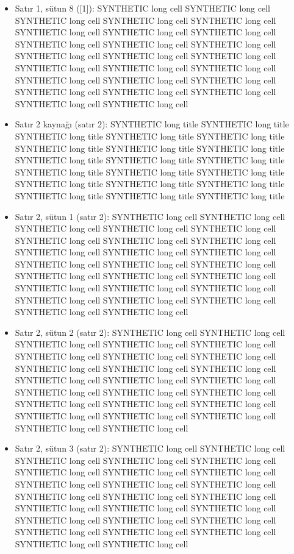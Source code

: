 \documentclass[journal]{IEEEtran}
\begin{document}
\begin{itemize}
\item[10.] Satır 1, sütun 8 ([1]): SYNTHETIC long cell SYNTHETIC long cell SYNTHETIC long cell SYNTHETIC long cell SYNTHETIC long cell SYNTHETIC long cell SYNTHETIC long cell SYNTHETIC long cell SYNTHETIC long cell SYNTHETIC long cell SYNTHETIC long cell SYNTHETIC long cell SYNTHETIC long cell SYNTHETIC long cell SYNTHETIC long cell SYNTHETIC long cell SYNTHETIC long cell SYNTHETIC long cell SYNTHETIC long cell SYNTHETIC long cell SYNTHETIC long cell SYNTHETIC long cell SYNTHETIC long cell SYNTHETIC long cell SYNTHETIC long cell
\item[11.] Satır 2 kaynağı (satır 2): SYNTHETIC long title SYNTHETIC long title SYNTHETIC long title SYNTHETIC long title SYNTHETIC long title SYNTHETIC long title SYNTHETIC long title SYNTHETIC long title SYNTHETIC long title SYNTHETIC long title SYNTHETIC long title SYNTHETIC long title SYNTHETIC long title SYNTHETIC long title SYNTHETIC long title SYNTHETIC long title SYNTHETIC long title SYNTHETIC long title SYNTHETIC long title SYNTHETIC long title
\item[12.] Satır 2, sütun 1 (satır 2): SYNTHETIC long cell SYNTHETIC long cell SYNTHETIC long cell SYNTHETIC long cell SYNTHETIC long cell SYNTHETIC long cell SYNTHETIC long cell SYNTHETIC long cell SYNTHETIC long cell SYNTHETIC long cell SYNTHETIC long cell SYNTHETIC long cell SYNTHETIC long cell SYNTHETIC long cell SYNTHETIC long cell SYNTHETIC long cell SYNTHETIC long cell SYNTHETIC long cell SYNTHETIC long cell SYNTHETIC long cell SYNTHETIC long cell SYNTHETIC long cell SYNTHETIC long cell SYNTHETIC long cell SYNTHETIC long cell
\item[13.] Satır 2, sütun 2 (satır 2): SYNTHETIC long cell SYNTHETIC long cell SYNTHETIC long cell SYNTHETIC long cell SYNTHETIC long cell SYNTHETIC long cell SYNTHETIC long cell SYNTHETIC long cell SYNTHETIC long cell SYNTHETIC long cell SYNTHETIC long cell SYNTHETIC long cell SYNTHETIC long cell SYNTHETIC long cell SYNTHETIC long cell SYNTHETIC long cell SYNTHETIC long cell SYNTHETIC long cell SYNTHETIC long cell SYNTHETIC long cell SYNTHETIC long cell SYNTHETIC long cell SYNTHETIC long cell SYNTHETIC long cell SYNTHETIC long cell
\item[14.] Satır 2, sütun 3 (satır 2): SYNTHETIC long cell SYNTHETIC long cell SYNTHETIC long cell SYNTHETIC long cell SYNTHETIC long cell SYNTHETIC long cell SYNTHETIC long cell SYNTHETIC long cell SYNTHETIC long cell SYNTHETIC long cell SYNTHETIC long cell SYNTHETIC long cell SYNTHETIC long cell SYNTHETIC long cell SYNTHETIC long cell SYNTHETIC long cell SYNTHETIC long cell SYNTHETIC long cell SYNTHETIC long cell SYNTHETIC long cell SYNTHETIC long cell SYNTHETIC long cell SYNTHETIC long cell SYNTHETIC long cell SYNTHETIC long cell

\end{itemize}
\end{document}
